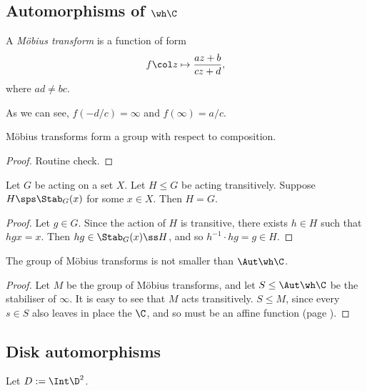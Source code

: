 \subsection{Automorphisms of $\wh \C$}

\begin{definition}
  A \emph{Möbius transform} is a function of form
  $$ f\col z \mapsto \frac{az+b}{cz+d}, $$
  where $ad \ne bc$.
\end{definition}

As we can see, $f(-d/c) = \infty$ and $f(\infty) = a/c$.

\begin{lemma}
  Möbius transforms form a group with respect to composition.
\end{lemma}

\begin{proof}
  Routine check.
\end{proof}

\begin{lemma}
  \label{transitive subgroup that contains a stabiliser is the whole G}
  Let $G$ be acting on a set $X$.
  Let $H \le G$ be acting transitively.
  Suppose $H \sps \Stab_G(x)$ for some $x \in X$.
  Then $H = G$.
\end{lemma}

\begin{proof}
  Let $g \in G$. Since the action of $H$ is transitive, there exists $h \in H$ such that
  $ hgx = x. $
  Then $hg \in \Stab_G(x) \ss H$, and so $h^{-1} \cdot hg = g \in H$.
\end{proof}

\begin{theorem}
  The group of Möbius transforms is not smaller than $\Aut \wh \C$.
\end{theorem}

\begin{proof}
  Let $M$ be the group of Möbius transforms, and let $S \le \Aut \wh \C$ be the stabiliser of $\infty$.
  It is easy to see that $M$ acts transitively.
  $S \le M$, since every $s \in S$ also leaves in place the $\C$, and so must be an affine function (page \pageref{automorphisms of C}).
\end{proof}

\subsection{Disk automorphisms}

Let $D := \Int \D^2$.

